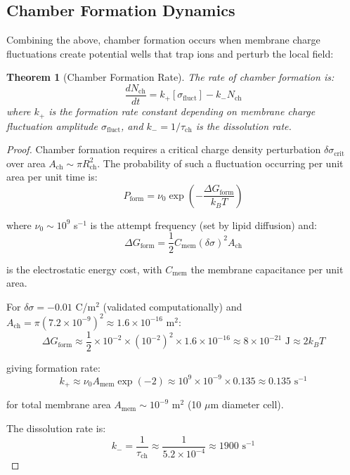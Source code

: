 \documentclass[twocolumn,10pt,aps,prd,superscriptaddress,floatfix,nofootinbib]{revtex4-2}
\newtheorem{theorem}{Theorem}[section]
\theoremstyle{remark}
\begin{document}
\subsection{Chamber Formation Dynamics}

Combining the above, chamber formation occurs when membrane charge fluctuations create potential wells that trap ions and perturb the local field:

\begin{theorem}[Chamber Formation Rate]
\label{thm:formation_rate}
The rate of chamber formation is:
\begin{equation}
\frac{d N_{\mathrm{ch}}}{dt} = k_+[\sigma_{\mathrm{fluct}}] - k_- N_{\mathrm{ch}}
\label{eq:chamber_rate}
\end{equation}
where $k_+$ is the formation rate constant depending on membrane charge fluctuation amplitude $\sigma_{\mathrm{fluct}}$, and $k_- = 1/\tau_{\mathrm{ch}}$ is the dissolution rate.
\end{theorem}

\begin{proof}
Chamber formation requires a critical charge density perturbation $\delta\sigma_{\mathrm{crit}}$ over area $A_{\mathrm{ch}} \sim \pi R_{\mathrm{ch}}^2$. The probability of such a fluctuation occurring per unit area per unit time is:
\begin{equation}
P_{\mathrm{form}} = \nu_0 \exp\left(-\frac{\Delta G_{\mathrm{form}}}{k_B T}\right)
\end{equation}

where $\nu_0 \sim 10^9$ s$^{-1}$ is the attempt frequency (set by lipid diffusion) and:
\begin{equation}
\Delta G_{\mathrm{form}} = \frac{1}{2}C_{\mathrm{mem}} (\delta\sigma)^2 A_{\mathrm{ch}}
\end{equation}

is the electrostatic energy cost, with $C_{\mathrm{mem}}$ the membrane capacitance per unit area.

For $\delta\sigma = -0.01$ C/m$^2$ (validated computationally) and $A_{\mathrm{ch}} = \pi(7.2 \times 10^{-9})^2 \approx 1.6 \times 10^{-16}$ m$^2$:
\begin{equation}
\Delta G_{\mathrm{form}} \approx \frac{1}{2} \times 10^{-2} \times (10^{-2})^2 \times 1.6 \times 10^{-16} \approx 8 \times 10^{-21} \text{ J} \approx 2 k_B T
\end{equation}

giving formation rate:
\begin{equation}
k_+ \approx \nu_0 A_{\mathrm{mem}} \exp(-2) \approx 10^9 \times 10^{-9} \times 0.135 \approx 0.135 \text{ s}^{-1}
\end{equation}

for total membrane area $A_{\mathrm{mem}} \sim 10^{-9}$ m$^2$ (10 $\mu$m diameter cell).

The dissolution rate is:
\begin{equation}
k_- = \frac{1}{\tau_{\mathrm{ch}}} \approx \frac{1}{5.2 \times 10^{-4}} \approx 1900 \text{ s}^{-1}
\end{equation}
\end{proof}
\end{document}
